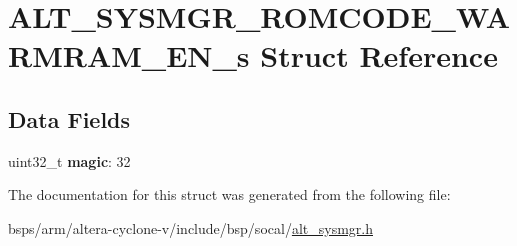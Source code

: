 \hypertarget{structALT__SYSMGR__ROMCODE__WARMRAM__EN__s}{}\section{A\+L\+T\+\_\+\+S\+Y\+S\+M\+G\+R\+\_\+\+R\+O\+M\+C\+O\+D\+E\+\_\+\+W\+A\+R\+M\+R\+A\+M\+\_\+\+E\+N\+\_\+s Struct Reference}
\label{structALT__SYSMGR__ROMCODE__WARMRAM__EN__s}
\subsection*{Data Fields}
\begin{DoxyCompactItemize}
\item 
\mbox{\label{structALT__SYSMGR__ROMCODE__WARMRAM__EN__s_afbe6eb4109802682367266c2f2c02c78}} 
uint32\+\_\+t {\bfseries magic}\+: 32
\end{DoxyCompactItemize}


The documentation for this struct was generated from the following file\+:\begin{DoxyCompactItemize}
\item 
bsps/arm/altera-\/cyclone-\/v/include/bsp/socal/\mbox{\hyperlink{alt__sysmgr_8h}{alt\+\_\+sysmgr.\+h}}\end{DoxyCompactItemize}
